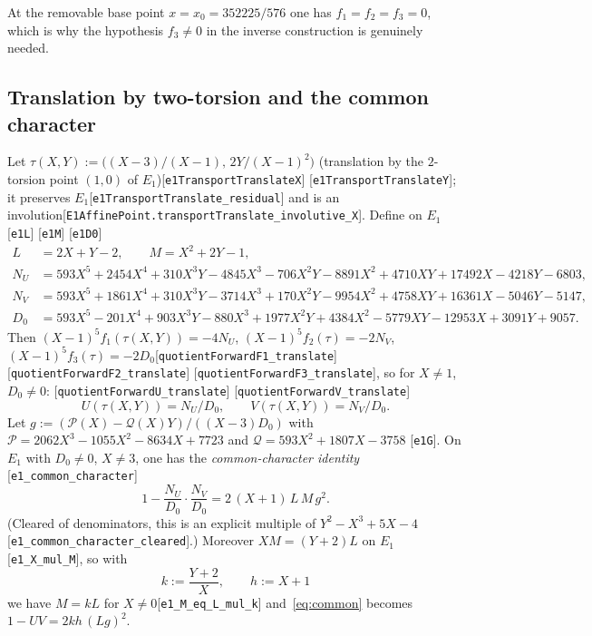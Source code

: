 \documentclass[10pt]{article}
\theoremstyle{definition}
\theoremstyle{remark}
\newcommand{\leanref}[1]{{\scriptsize\textup{[\texttt{#1}]}}\allowbreak}
\begin{document}
At the removable base point $x=x_0=352225/576$ one has $f_1=f_2=f_3=0$,
which is why the hypothesis $f_3\ne0$ in the inverse construction is
genuinely needed.

\subsection{Translation by two-torsion and the common character}\label{sec:translate}

Let $\tau(X,Y):=\bigl((X-3)/(X-1),\,2Y/(X-1)^2\bigr)$ (translation by the
$2$-torsion point $(1,0)$ of $E_1$)\leanref{e1\allowbreak Transport\allowbreak Translate\allowbreak X} \leanref{e1\allowbreak Transport\allowbreak Translate\allowbreak Y};
it preserves $E_1$\leanref{e1\allowbreak Transport\allowbreak Translate\_\allowbreak residual} and is an
involution\leanref{E1\allowbreak Affine\allowbreak Point.transport\allowbreak Translate\_\allowbreak involutive\_\allowbreak X}.
Define on $E_1$\leanref{e1\allowbreak L} \leanref{e1\allowbreak M} \leanref{e1\allowbreak D0}
\begin{align*}
L&=2X+Y-2,\qquad M=X^2+2Y-1,\\
N_U&=593X^5+2454X^4+310X^3Y-4845X^3-706X^2Y-8891X^2+4710XY+17492X-4218Y-6803,\\
N_V&=593X^5+1861X^4+310X^3Y-3714X^3+170X^2Y-9954X^2+4758XY+16361X-5046Y-5147,\\
D_0&=593X^5-201X^4+903X^3Y-880X^3+1977X^2Y+4384X^2-5779XY-12953X+3091Y+9057 .
\end{align*}
Then $(X-1)^5f_1(\tau(X,Y))=-4N_U$, $(X-1)^5f_2(\tau)=-2N_V$,
$(X-1)^5f_3(\tau)=-2D_0$\leanref{quotient\allowbreak Forward\allowbreak F1\_\allowbreak translate} \leanref{quotient\allowbreak Forward\allowbreak F2\_\allowbreak translate} \leanref{quotient\allowbreak Forward\allowbreak F3\_\allowbreak translate},
so for $X\ne1$, $D_0\ne0$:
\leanref{quotient\allowbreak Forward\allowbreak U\_\allowbreak translate} \leanref{quotient\allowbreak Forward\allowbreak V\_\allowbreak translate}
\[
 U(\tau(X,Y))=N_U/D_0,\qquad V(\tau(X,Y))=N_V/D_0 .
\]
Let $g:=(\mathcal{P}(X)-\mathcal{Q}(X)Y)/((X-3)D_0)$ with
$\mathcal{P}=2062X^3-1055X^2-8634X+7723$ and $\mathcal{Q}=593X^2+1807X-3758$
\leanref{e1\allowbreak G}.  On $E_1$ with $D_0\ne0$, $X\ne3$, one has the
\emph{common-character identity} \leanref{e1\_\allowbreak common\_\allowbreak character}
\begin{equation}\label{eq:common}
 1-\frac{N_U}{D_0}\cdot\frac{N_V}{D_0}=2\,(X+1)\,L\,M\,g^2 .
\end{equation}
(Cleared of denominators, this is an explicit multiple of
$Y^2-X^3+5X-4$\leanref{e1\_\allowbreak common\_\allowbreak character\_\allowbreak cleared}.)
Moreover $XM=(Y+2)L$ on $E_1$\leanref{e1\_\allowbreak X\_\allowbreak mul\_\allowbreak M}, so with
\[
 k:=\frac{Y+2}{X},\qquad h:=X+1
\]
we have $M=kL$ for $X\ne0$\leanref{e1\_\allowbreak M\_\allowbreak eq\_\allowbreak L\_\allowbreak mul\_\allowbreak k} and~\eqref{eq:common}
becomes $1-UV=2kh\,(Lg)^2$.
\end{document}
